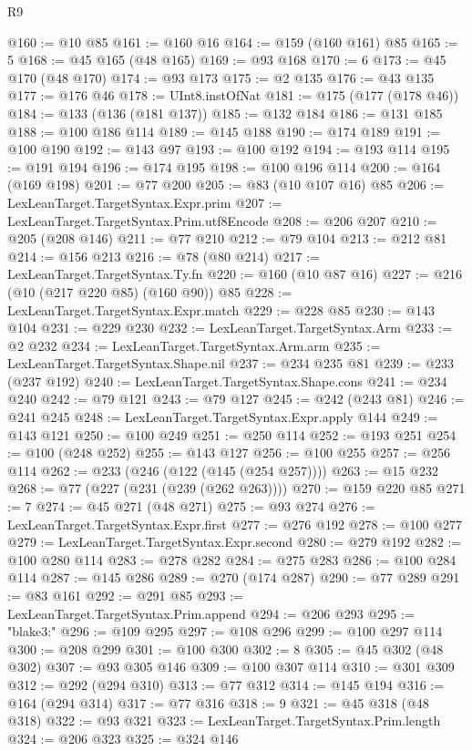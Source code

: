 \begin{lexlean}{R9}
\begin{coremodule}
@160 := @10 @85
@161 := @160 @16
@164 := @159 (@160 @161) @85
@165 := 5
@168 := @45 @165 (@48 @165)
@169 := @93 @168
@170 := 6
@173 := @45 @170 (@48 @170)
@174 := @93 @173
@175 := @2 @135
@176 := @43 @135
@177 := @176 @46
@178 := UInt8.instOfNat
@181 := @175 (@177 (@178 @46))
@184 := @133 (@136 (@181 @137))
@185 := @132 @184
@186 := @131 @185
@188 := @100 @186 @114
@189 := @145 @188
@190 := @174 @189
@191 := @100 @190
@192 := @143 @97
@193 := @100 @192
@194 := @193 @114
@195 := @191 @194
@196 := @174 @195
@198 := @100 @196 @114
@200 := @164 (@169 @198)
@201 := @77 @200
@205 := @83 (@10 @107 @16) @85
@206 := LexLeanTarget.TargetSyntax.Expr.prim
@207 := LexLeanTarget.TargetSyntax.Prim.utf8Encode
@208 := @206 @207
@210 := @205 (@208 @146)
@211 := @77 @210
@212 := @79 @104
@213 := @212 @81
@214 := @156 @213
@216 := @78 (@80 @214)
@217 := LexLeanTarget.TargetSyntax.Ty.fn
@220 := @160 (@10 @87 @16)
@227 := @216 (@10 (@217 @220 @85) (@160 @90)) @85
@228 := LexLeanTarget.TargetSyntax.Expr.match
@229 := @228 @85
@230 := @143 @104
@231 := @229 @230
@232 := LexLeanTarget.TargetSyntax.Arm
@233 := @2 @232
@234 := LexLeanTarget.TargetSyntax.Arm.arm
@235 := LexLeanTarget.TargetSyntax.Shape.nil
@237 := @234 @235 @81
@239 := @233 (@237 @192)
@240 := LexLeanTarget.TargetSyntax.Shape.cons
@241 := @234 @240
@242 := @79 @121
@243 := @79 @127
@245 := @242 (@243 @81)
@246 := @241 @245
@248 := LexLeanTarget.TargetSyntax.Expr.apply @144
@249 := @143 @121
@250 := @100 @249
@251 := @250 @114
@252 := @193 @251
@254 := @100 (@248 @252)
@255 := @143 @127
@256 := @100 @255
@257 := @256 @114
@262 := @233 (@246 (@122 (@145 (@254 @257))))
@263 := @15 @232
@268 := @77 (@227 (@231 (@239 (@262 @263))))
@270 := @159 @220 @85
@271 := 7
@274 := @45 @271 (@48 @271)
@275 := @93 @274
@276 := LexLeanTarget.TargetSyntax.Expr.first
@277 := @276 @192
@278 := @100 @277
@279 := LexLeanTarget.TargetSyntax.Expr.second
@280 := @279 @192
@282 := @100 @280 @114
@283 := @278 @282
@284 := @275 @283
@286 := @100 @284 @114
@287 := @145 @286
@289 := @270 (@174 @287)
@290 := @77 @289
@291 := @83 @161
@292 := @291 @85
@293 := LexLeanTarget.TargetSyntax.Prim.append
@294 := @206 @293
@295 := "blake3:"
@296 := @109 @295
@297 := @108 @296
@299 := @100 @297 @114
@300 := @208 @299
@301 := @100 @300
@302 := 8
@305 := @45 @302 (@48 @302)
@307 := @93 @305 @146
@309 := @100 @307 @114
@310 := @301 @309
@312 := @292 (@294 @310)
@313 := @77 @312
@314 := @145 @194
@316 := @164 (@294 @314)
@317 := @77 @316
@318 := 9
@321 := @45 @318 (@48 @318)
@322 := @93 @321
@323 := LexLeanTarget.TargetSyntax.Prim.length
@324 := @206 @323
@325 := @324 @146

\end{coremodule}
\end{lexlean}
